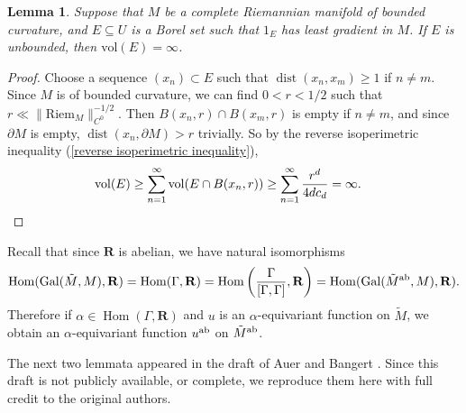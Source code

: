 \documentclass[reqno,11pt]{amsart}
\newcommand{\RR}{\mathbf{R}}
\DeclareMathOperator{\dist}{dist}
\DeclareMathOperator{\Hom}{Hom}
\newcommand{\vol}{\mathrm{vol}}
\DeclareMathOperator{\Gal}{Gal}
\newcommand{\Riem}{\mathrm{Riem}}
\newtheorem{lemma}[theorem]{Lemma}
\theoremstyle{definition}
\numberwithin{equation}{section}
\begin{document}
\begin{lemma}\label{unbounded implies infinite measure}
Suppose that $M$ be a complete Riemannian manifold of bounded curvature, and $E \subseteq U$ is a Borel set such that $1_E$ has least gradient in $M$.
If $E$ is unbounded, then $\vol(E) = \infty$.
\end{lemma}
\begin{proof}
Choose a sequence $(x_n) \subset E$ such that $\dist(x_n, x_m) \geq 1$ if $n \neq m$.
Since $M$ is of bounded curvature, we can find $0 < r < 1/2$ such that $r \ll \|\Riem_M\|_{C^0}^{-1/2}$.
Then $B(x_n, r) \cap B(x_m, r)$ is empty if $n \neq m$, and since $\partial M$ is empty, $\dist(x_n, \partial M) > r$ trivially.
So by the reverse isoperimetric inequality (\ref{reverse isoperimetric inequality}),
\begin{align*}
\vol(E) &\geq \sum_{n=1}^\infty \vol(E \cap B(x_n, r)) \geq \sum_{n=1}^\infty \frac{r^d}{4dc_d} = \infty. \qedhere 
\end{align*}
\end{proof}

Recall that since $\RR$ is abelian, we have natural isomorphisms
$$\Hom(\Gal(\tilde M, M), \RR) = \Hom(\Gamma, \RR) = \Hom\left(\frac{\Gamma}{[\Gamma, \Gamma]}, \RR\right) = \Hom(\Gal(\tilde M^{\rm ab}, M), \RR).$$
Therefore if $\alpha \in \Hom(\Gamma, \RR)$ and $u$ is an $\alpha$-equivariant function on $\tilde M$, we obtain an $\alpha$-equivariant function $u^{\rm ab}$ on $\tilde M^{\rm ab}$.

The next two lemmata appeared in the draft of Auer and Bangert \cite{Auer12}.
Since this draft is not publicly available, or complete, we reproduce them here with full credit to the original authors.
\end{document}
